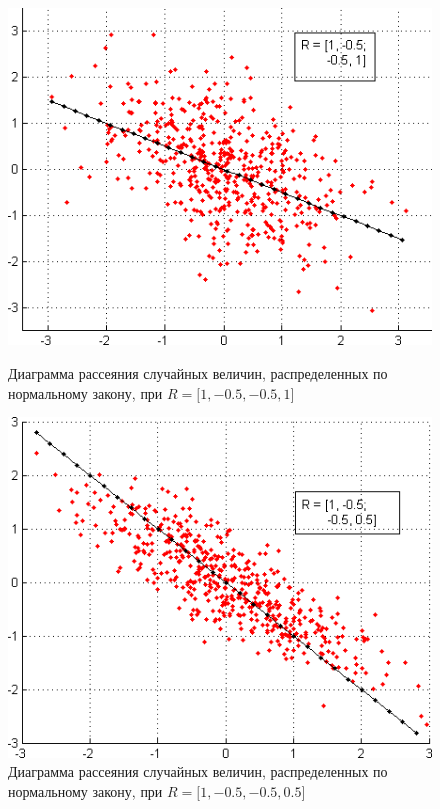 \begin{figure}[h!]
  \begin{minipage}[h!]{0.47\linewidth}
    \includegraphics[width=1\linewidth]{pic/normal_our_4}
    \caption{Диаграмма рассеяния случайных величин, распределенных по нормальному закону,
      при $ R = \big[1, -0.5, -0.5, 1 \big] $
  }
  \end{minipage}
  \hfill
  \begin{minipage}[h!]{0.47\linewidth}
    \includegraphics[width=1\linewidth]{pic/normal_our_5}
    \caption{Диаграмма рассеяния случайных величин, распределенных по нормальному закону,
      при $ R = \big[1, -0.5, -0.5, 0.5 \big] $
  }
  \label{pic:normal_end}
  \end{minipage}
\end{figure}

